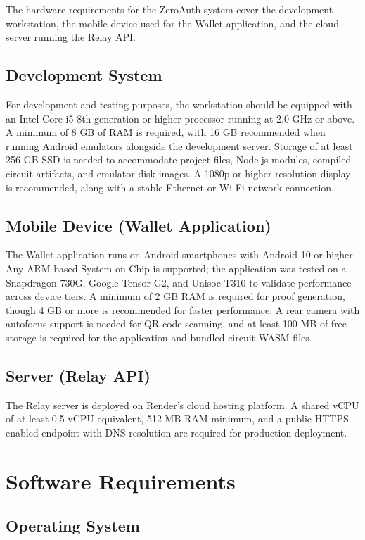 The hardware requirements for the ZeroAuth system cover the development workstation, the mobile device used for the Wallet application, and the cloud server running the Relay API.

\subsection{Development System}

For development and testing purposes, the workstation should be equipped with an Intel Core i5 8th generation or higher processor running at 2.0 GHz or above. A minimum of 8 GB of RAM is required, with 16 GB recommended when running Android emulators alongside the development server. Storage of at least 256 GB SSD is needed to accommodate project files, Node.js modules, compiled circuit artifacts, and emulator disk images. A 1080p or higher resolution display is recommended, along with a stable Ethernet or Wi-Fi network connection.

\subsection{Mobile Device (Wallet Application)}

The Wallet application runs on Android smartphones with Android 10 or higher. Any ARM-based System-on-Chip is supported; the application was tested on a Snapdragon 730G, Google Tensor G2, and Unisoc T310 to validate performance across device tiers. A minimum of 2 GB RAM is required for proof generation, though 4 GB or more is recommended for faster performance. A rear camera with autofocus support is needed for QR code scanning, and at least 100 MB of free storage is required for the application and bundled circuit WASM files.

\subsection{Server (Relay API)}

The Relay server is deployed on Render's cloud hosting platform. A shared vCPU of at least 0.5 vCPU equivalent, 512 MB RAM minimum, and a public HTTPS-enabled endpoint with DNS resolution are required for production deployment.

\section{Software Requirements}

\subsection{Operating System}

